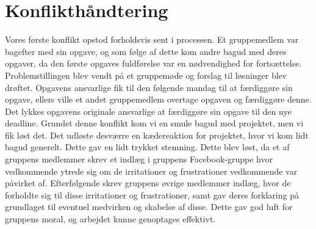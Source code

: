 \section{Konflikthåndtering}

Vores første konflikt opstod forholdsvis sent i processen. Et gruppemedlem var bagefter med sin opgave, og som følge af dette kom andre bagud med deres opgaver, da den første opgaves fuldførelse var en nødvendighed for fortsættelse. 
Problemstillingen blev vendt på et gruppemøde og forslag til løsninger blev drøftet. Opgavens ansvarlige fik til den følgende mandag til at færdiggøre sin opgave, ellers ville et andet gruppemedlem overtage opgaven og færdiggøre denne. Det lykkes opgavens originale ansvarlige at færdiggøre sin opgave til den nye deadline. 
Grundet denne konflikt kom vi en smule bagud med projektet, men vi fik løst det. Det udløste desværre en kædereaktion for projektet, hvor vi kom lidt bagud generelt. Dette gav en lidt trykket stemning. Dette blev løst, da et af gruppens medlemmer skrev et indlæg i gruppens Facebook-gruppe hvor vedkommende ytrede sig om de irritationer og frustrationer vedkommende var påvirket af. Efterfølgende skrev gruppens øvrige medlemmer indlæg, hvor de forholdte sig til disse irritationer og frustrationer, samt gav deres forklaring på grundlaget til eventuel medvirken og skabelse af disse. Dette gav god luft for gruppens moral, og arbejdet kunne genoptages effektivt.